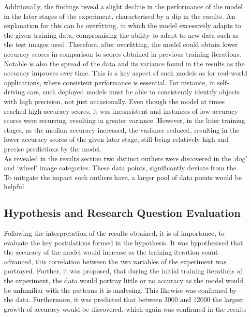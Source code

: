 Additionally, the findings reveal a slight decline in the performance of the model in the later stages of the experiment, characterised by a dip in the results. An explanation for this can be overfitting, in which the model excessively adapts to the given training data, compromising the ability to adapt to new data such as the test images used. Therefore, after overfitting, the model could obtain lower accuracy scores in comparison to scores obtained in previous training iterations. \\

Notable is also the spread of the data and its variance found in the results as the accuracy improves over time. This is a key aspect of such models as for real-world applications, where consistent performance is essential. For instance, in self-driving cars, such deployed models must be able to consistently identify objects with high precision, not just occasionally. Even though the model at times reached high accuracy scores, it was inconsistent and instances of low accuracy scores were recurring, resulting in greater variance. However, in the later training stages,  as the median accuracy increased, the variance reduced, resulting in the lower accuracy scores of the given later stage, still being relatively high and precise predictions by the model.   \\

As revealed in the results section two distinct outliers were discovered in the ‘dog’ and ‘wheel’ image categories. These data points, significantly deviate from the. To mitigate the impact such outliers have, a larger pool of data points would be helpful. \\

\subsection{Hypothesis and Research Question Evaluation}
Following the interpretation of the results obtained, it is of importance, to evaluate the key postulations formed in the hypothesis. It was hypothesised that the accuracy of the model would increase as the training iteration count advanced, this correlation between the two variables of the experiment was portrayed. Further, it was proposed, that during the initial training iterations of the experiment, the data would portray little or no accuracy as the model would be unfamiliar with the patterns it is analysing. This likewise was confirmed by the data. Furthermore, it was predicted that between 3000 and 12000 the largest growth of accuracy would be discovered, which again was confirmed in the results\\


